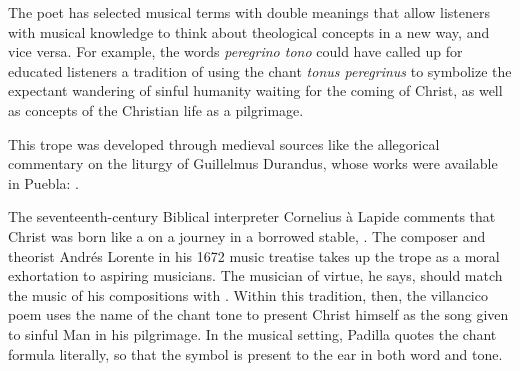 The poet has selected musical terms with double meanings that allow listeners
with musical knowledge to think about theological concepts in a new way, and
vice versa.
For example, the words \emph{peregrino tono} could have called up for educated
listeners a tradition of using the chant \emph{tonus peregrinus} to symbolize
the expectant wandering of sinful humanity waiting for the coming of Christ, as
well as concepts of the Christian life as a pilgrimage.%
\begin{Footnote}
    This trope was developed through medieval sources like the allegorical
    commentary on the liturgy of Guillelmus Durandus, whose works were available
    in Puebla: \autocite[234]{Wright:Maze}.
\end{Footnote}
The seventeenth-century Biblical interpreter Cornelius à Lapide comments that
Christ was born like a   on a journey in
a borrowed stable, .
    \Autocites
    [884, on Jn 1:14:
    .]
    {Lapide:Gospels19C}
    [669, on Lk 2:5: 
    .] 
    {Lapide:Gospels19C}
The composer and theorist Andrés Lorente in his 1672 music treatise takes up the
 trope as a moral exhortation to aspiring musicians.
The musician of virtue, he says, should match the music of his compositions with
.%
    \Autocite
    [609: .] 
    {Lorente:Porque}
Within this tradition, then, the villancico poem uses the name of the chant tone
to present Christ himself as the song given to sinful Man in his pilgrimage. 
In the musical setting, Padilla quotes the chant formula literally, so that the
symbol is present to the ear in both word and tone.


